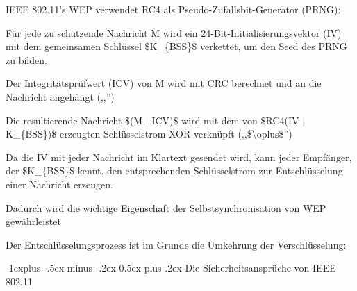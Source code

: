 \documentclass[a4paper]{article}
\makeatletter
\renewcommand{\subsection}{\@startsection{subsection}{2}{0mm}%
 {-1explus -.5ex minus -.2ex}%
 {0.5ex plus .2ex}%
 {\normalfont\normalsize\bfseries}}
\makeatother
\begin{document}
\begin{multicols}{3}
      \begin{itemize*}
            \item IEEE 802.11's WEP verwendet RC4 als Pseudo-Zufallsbit-Generator
            (PRNG):
            \begin{itemize*}
                  \item Für jede zu schützende Nachricht M wird ein 24-Bit-Initialisierungsvektor (IV) mit dem gemeinsamen Schlüssel \$K\_\{BSS\}\$ verkettet, um den Seed des PRNG zu bilden.
                  \item Der Integritätsprüfwert (ICV) von M wird mit CRC berechnet und an die Nachricht angehängt (,,\textbar\textbar'')
                  \item Die resultierende Nachricht \$(M \textbar| ICV)\$ wird mit dem von \$RC4(IV \textbar| K\_\{BSS\})\$ erzeugten Schlüsselstrom XOR-verknüpft (,,\$\textbackslash oplus\$'')
            \end{itemize*}
            \item Da die IV mit jeder Nachricht im Klartext gesendet wird, kann jeder
            Empfänger, der \$K\_\{BSS\}\$ kennt, den entsprechenden Schlüsselstrom
            zur Entschlüsselung einer Nachricht erzeugen.
            \begin{itemize*}
                  \item Dadurch wird die wichtige Eigenschaft der Selbstsynchronisation von WEP gewährleistet
                  \item Der Entschlüsselungsprozess ist im Grunde die Umkehrung der Verschlüsselung:
            \end{itemize*}
      \end{itemize*}


      \subsection{Die Sicherheitsansprüche von IEEE
            802.11}


\end{multicols}
\end{document}
